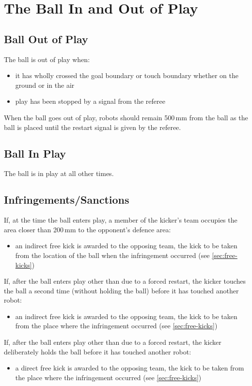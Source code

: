 \section{The Ball In and Out of Play}\label{sec:ball-in-and-out-of-play}

\subsection{Ball Out of Play}
The ball is out of play when:
\begin{itemize}
\item it has wholly crossed the goal boundary or touch boundary whether on the ground or in the air
\item play has been stopped by a signal from the referee
\end{itemize}

When the ball goes out of play, robots should remain 500\,mm from the ball as the ball is placed until the restart signal is given by the referee.

\subsection{Ball In Play}
The ball is in play at all other times.

\subsection{Infringements/Sanctions}
If, at the time the ball enters play, a member of the kicker's team occupies the area closer than 200\,mm to the opponent's defence area:
\begin{itemize}
\item an indirect free kick is awarded to the opposing team, the kick to be taken from the location of the ball when the infringement occurred (see \autoref{sec:free-kicks})
\end{itemize}

If, after the ball enters play other than due to a forced restart, the kicker touches the ball a second time (without holding the ball) before it has touched another robot:
\begin{itemize}
\item an indirect free kick is awarded to the opposing team, the kick to be taken from the place where the infringement occurred (see \autoref{sec:free-kicks})
\end{itemize}

If, after the ball enters play other than due to a forced restart, the kicker deliberately holds the ball before it has touched another robot:
\begin{itemize}
\item a direct free kick is awarded to the opposing team, the kick to be taken from the place where the infringement occurred (see \autoref{sec:free-kicks})
\end{itemize}

